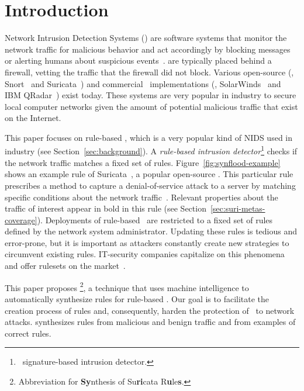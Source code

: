 \documentclass[sigconf,anonymous]{acmart}
\begin{document}
\maketitle

\section{Introduction}
\label{sec:intro}

Network Intrusion Detection Systems (\nids{}) are software systems
that monitor the network traffic for malicious behavior and act
accordingly by blocking messages or alerting humans about suspicious
events~\cite{Mitchell:2014:SID:2597757.2542049}. \nids{} are typically
placed behind a firewall, vetting the traffic that the firewall did
not block. Various open-source (\eg{}, Snort~\cite{snort} and
Suricata~\cite{suricata}) and commercial \nids\ implementations (\eg{},
SolarWinds~\cite{solarwinds} and IBM QRadar~\cite{qradar}) exist
today. These systems are very popular in industry to secure local
computer networks given the amount of potential malicious traffic that
exist on the Internet.

This paper focuses on rule-based \nids{}, which is a very popular kind
of NIDS used in industry (see Section~\ref{sec:background}). A
\emph{rule-based intrusion detector}\footnote{\aka\ signature-based
  intrusion detector.} checks if the network traffic matches a fixed
set of rules. Figure~\ref{fig:synflood-example} shows an example rule
of Suricata~\cite{suricata}, a popular open-source \nids{}. This
particular rule prescribes a method to capture a denial-of-service
attack to a server by matching specific conditions about the network
traffic~\cite{understanding-dos}. Relevant properties about the
traffic of interest appear in bold in this rule (see
Section~\ref{sec:suri-metas-coverage}). Deployments of rule-based
\nids\ are restricted to a fixed set of rules defined by the network
system administrator. Updating these rules is tedious and error-prone,
but it is important as attackers constantly create new strategies to
circumvent existing rules. IT-security companies capitalize on this
phenomena and offer rulesets on the
market~\cite{proofpoint-etpro,snort-rule-subscriptions}.

This paper proposes \tname{}\footnote{Abbreviation for
  \textbf{Sy}nthesis of Su\textbf{ri}cata R\textbf{u}le\textbf{s}.}, a
technique that uses machine intelligence to automatically synthesize
rules for rule-based \nids. Our goal is to facilitate the creation
process of rules and, consequently, harden the protection of \nids\ to
network attacks. \tname{} synthesizes rules from malicious and benign
traffic and from examples of correct rules.
\end{document}
